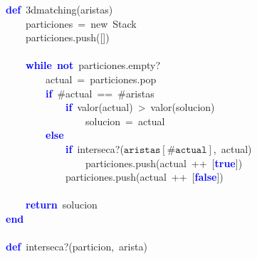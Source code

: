 \noindent
\mbox{}\textbf{\textcolor{Blue}{def}}\ 3dmatching\textcolor{BrickRed}{(}aristas\textcolor{BrickRed}{)} \\
\mbox{}\ \ \ \ particiones\ \textcolor{BrickRed}{=}\ new\ Stack \\
\mbox{}\ \ \ \ particiones\textcolor{BrickRed}{.}push\textcolor{BrickRed}{([])} \\
\mbox{} \\
\mbox{}\ \ \ \ \textbf{\textcolor{Blue}{while}}\ \textbf{\textcolor{Blue}{not}}\ particiones\textcolor{BrickRed}{.}empty? \\
\mbox{}\ \ \ \ \ \ \ \ actual\ \textcolor{BrickRed}{=}\ particiones\textcolor{BrickRed}{.}pop \\
\mbox{}\ \ \ \ \ \ \ \ \textbf{\textcolor{Blue}{if}}\ $\#$actual\ \textcolor{BrickRed}{==}\ $\#$aristas \\
\mbox{}\ \ \ \ \ \ \ \ \ \ \ \ \textbf{\textcolor{Blue}{if}}\ valor\textcolor{BrickRed}{(}actual\textcolor{BrickRed}{)}\ \textcolor{BrickRed}{\textgreater{}}\ valor\textcolor{BrickRed}{(}solucion\textcolor{BrickRed}{)} \\
\mbox{}\ \ \ \ \ \ \ \ \ \ \ \ \ \ \ \ solucion\ \textcolor{BrickRed}{=}\ actual \\
\mbox{}\ \ \ \ \ \ \ \ \textbf{\textcolor{Blue}{else}} \\
\mbox{}\ \ \ \ \ \ \ \ \ \ \ \ \textbf{\textcolor{Blue}{if}}\ interseca?\textcolor{BrickRed}{(}$\mathtt{aristas[\#actual]}$\textcolor{BrickRed}{,}\ actual\textcolor{BrickRed}{)} \\
\mbox{}\ \ \ \ \ \ \ \ \ \ \ \ \ \ \ \ particiones\textcolor{BrickRed}{.}push\textcolor{BrickRed}{(}actual\ \textcolor{BrickRed}{++}\ \textcolor{BrickRed}{[}\textbf{\textcolor{Blue}{true}}\textcolor{BrickRed}{])} \\
\mbox{}\ \ \ \ \ \ \ \ \ \ \ \ particiones\textcolor{BrickRed}{.}push\textcolor{BrickRed}{(}actual\ \textcolor{BrickRed}{++}\ \textcolor{BrickRed}{[}\textbf{\textcolor{Blue}{false}}\textcolor{BrickRed}{])} \\
\mbox{} \\
\mbox{}\ \ \ \ \textbf{\textcolor{Blue}{return}}\ solucion \\
\mbox{}\textbf{\textcolor{Blue}{end}} \\
\mbox{} \\
\mbox{}\textbf{\textcolor{Blue}{def}}\ interseca?\textcolor{BrickRed}{(}particion\textcolor{BrickRed}{,}\ arista\textcolor{BrickRed}{)} \\
